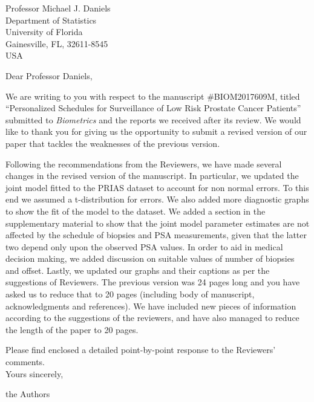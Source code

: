 \documentclass[a4paper, 11pt]{letter}
\begin{document}
\begin{letter}{Professor Michael J. Daniels\\
Department of Statistics\\
University of Florida\\
Gainesville, FL, 32611-8545\\
USA}

\address{Department of Biostatistics\\
Erasmus University Medical Center\\PO Box 2040, 3000 CA Rotterdam\\ the Netherlands
}

\opening{Dear Professor Daniels,}

We are writing to you with respect to the manuscript \#BIOM2017609M, titled ``Personalized Schedules for Surveillance of Low Risk Prostate Cancer Patients'' submitted to \emph{Biometrics} and the reports we received after its review. We would like to thank you for giving us the opportunity to submit a revised version of our paper that tackles the weaknesses of the previous version.

Following the recommendations from the Reviewers, we have made several changes in the revised version of the manuscript. In particular, we updated the joint model fitted to the PRIAS dataset to account for non normal errors. To this end we assumed a t-distribution for errors. We also added more diagnostic graphs to show the fit of the model to the dataset. We added a section in the supplementary material to show that the joint model parameter estimates are not affected by the schedule of biopsies and PSA measurements, given that the latter two depend only upon the observed PSA values. In order to aid in medical decision making, we added discussion on suitable values of number of biopsies and offset. Lastly, we updated our graphs and their captions as per the suggestions of Reviewers. The previous version was 24 pages long and you have asked us to reduce that to 20 pages (including body of manuscript, acknowledgments and references). We have included new pieces of information according to the suggestions of the reviewers, and have also managed to reduce the length of the paper to 20 pages.

Please find enclosed a detailed point-by-point response to the Reviewers' comments.\\

Yours sincerely,

the Authors


\end{letter}
\end{document}
